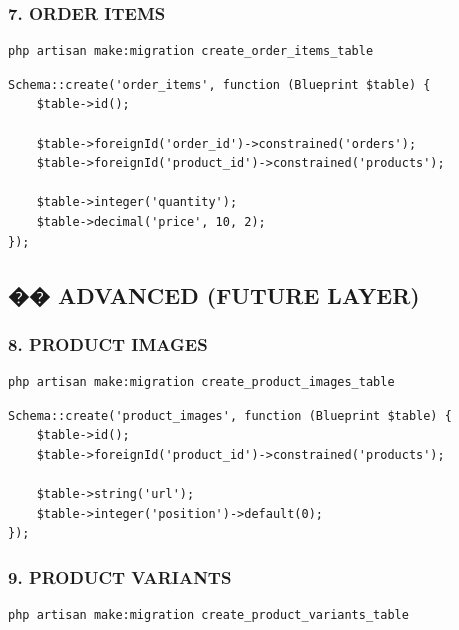 \documentclass[12pt,a4paper]{article}
\begin{document}
\subsubsection{7. ORDER ITEMS}
\begin{verbatim}
php artisan make:migration create_order_items_table
\end{verbatim}

\begin{verbatim}
Schema::create('order_items', function (Blueprint $table) {
    $table->id();

    $table->foreignId('order_id')->constrained('orders');
    $table->foreignId('product_id')->constrained('products');

    $table->integer('quantity');
    $table->decimal('price', 10, 2);
});
\end{verbatim}

\subsection{�� ADVANCED (FUTURE LAYER)}

\subsubsection{8. PRODUCT IMAGES}
\begin{verbatim}
php artisan make:migration create_product_images_table
\end{verbatim}

\begin{verbatim}
Schema::create('product_images', function (Blueprint $table) {
    $table->id();
    $table->foreignId('product_id')->constrained('products');

    $table->string('url');
    $table->integer('position')->default(0);
});
\end{verbatim}

\subsubsection{9. PRODUCT VARIANTS}
\begin{verbatim}
php artisan make:migration create_product_variants_table
\end{verbatim}
\end{document}

